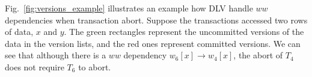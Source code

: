 \documentclass[conference]{IEEEtran}
\begin{document}
Fig.~\ref{fig:versions_example} illustrates an example how DLV handle $ww$ dependencies when transaction abort.
Suppose the transactions accessed two rows of data, ${x}$ and ${y}$.
The green rectangles represent the uncommitted versions of the data in the version lists, and the red ones represent committed versions.
We can see that although there is a ${ww}$ dependency ${w_6[x] \rightarrow w_4[x]}$,
the abort of $T_4$ does not require ${T_6}$ to abort.
\begin{figure}[tbp]
  \centering
  \subfloat[\small ${H_c = H_b a_3a_5}$]

\end{figure}
\end{document}
